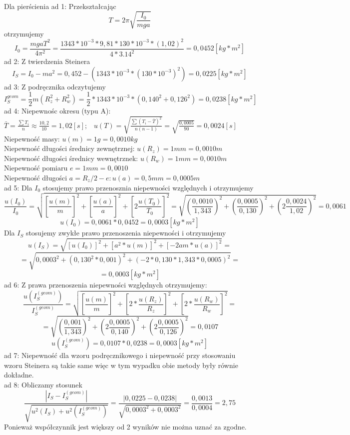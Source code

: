 \documentclass[a4paper,10pt,twoside]{article}
\begin{document}
\noindent
\\Dla pierścienia
\noindent
ad 1: Przekształcając 
$$
T = 2\pi\sqrt{\frac{I_0}{mga}}
$$
otrzymujemy
$$
I_0 = \frac{mgaT^2}{4\pi^2} = \frac{1343 * 10^{-3} * 9,81 * 130 * 10^{-3} * (1,02)^2}{4*3.14^2} = 0,0452[kg*m^2]
$$
ad 2: Z twierdzenia Steinera 
$$
I_S = I_0 - ma^2 = 0,452 - (1343*10^{-3}*(130*10^{-3})^2) = 0,0225[kg*m^2]
$$
ad 3: Z podręcznika odczytujemy $$I_S^{geom} = \frac{1}{2}m(R_z^2+ R_w^2) = \frac{1}{2}*1343*10^{-3}*(0,140^2 + 0,126^2) = 0,0238[kg*m^2]
$$
ad 4: Niepewnośc okresu (typu A): $\bar{T} = \frac{\sum T_i}{n} \approx \frac{10,2}{10} = 1,02[s] ;\hspace{10pt} u(T) = \sqrt{\frac{\sum (T_i - \bar{T})^2}{n(n-1)}} = \sqrt{\frac{0,0005}{90}} = 0,0024[s] 
$
\\ Niepewność masy: $u(m) = 1 g = 0,0010 kg$ 
\\ Niepewność długości średnicy zewnętrznej: $u(R_z) = 1 mm = 0,0010 m$
\\ Niepewność długości średnicy wewnętrznek:
 $u(R_w) = 1 mm = 0,0010 m$
\\Niepewność pomiaru $e = 1mm = 0,0010$
\\ Niepewność długości $a = R_z/2 - e: u(a) = 0,5mm = 0,0005 m$
\\ad 5: Dla $I_0$ stosujemy prawo przenosznia niepewności względnych i otrzymujemy 
$$
\frac{u(I_0)}{I_0} = \sqrt{\left[\frac{u(m)}{m}\right]^2 + \left[\frac{u(a)}{a}\right]^2 + \left[2\frac{u(T_0)}{T_0}\right]^2} = \sqrt{\left(\frac{0,0010}{1,343}\right)^2 + \left(\frac{0,0005}{0,130}\right)^2 + \left(2\frac{0,0024}{1,02}\right)^2} = 0,0061
$$
$$
u(I_0) = 0,0061 * 0,0452 = 0,0003[kg * m^2]
$$
Dla $I_S$ stosujemy zwykłe prawo przenoszenia niepewności i otrzymujemy 
$$
u(I_S) = \sqrt{[u(I_0)]^2 + [a^2 * u(m)]^2 + [-2 am * u(a)]^2} =$$ $$= \sqrt{0,0003^2 + (0,130^2 * 0,001)^2 + (-2*0,130*1,343*0,0005)^2} = $$
$$ = 0,0003[kg * m^2]
$$
ad 6: Z prawa przenoszenia niepewności względnych otrzymujemy:
$$
\frac{u(I_S^{(geom)})}{I_S^{(geom)}} = \sqrt{\left[\frac{u(m)}{m}\right]^2 + \left[2*\frac{u(R_z)}{R_z}\right]^2 + \left[2*\frac{u(R_w)}{R_w}\right]^2}=$$ $$ = \sqrt{\left(\frac{0,001}{1,343}\right)^2 + \left(2\frac{0,0005}{0,140}\right)^2 + \left(2\frac{0,0005}{0,126}\right)^2} = 0,0107$$
$$
u(I_S^{(geom)}) = 0,0107 * 0,0238 = 0,0003[kg*m^2]
$$
ad 7: Niepewność dla wzoru podręcznikowego i niepewność przy stosowaniu wzoru Steinera 
są takie same więc w tym wypadku obie metody były równie dokładne.
\\ad 8: Obliczamy stosunek
$$
\frac{|I_S - I_S^{(geom)}|}{\sqrt{u^2(I_S) +  u^2(I_S^{(geom)})}} = \frac{|0,0225 - 0,0238|}{\sqrt{0,0003^2 + 0,0003^2}} = \frac{0,0013}{0,0004} = 2,75
$$
Ponieważ współczynnik jest większy od 2 wyników nie można uznać za zgodne.
\end{document}
